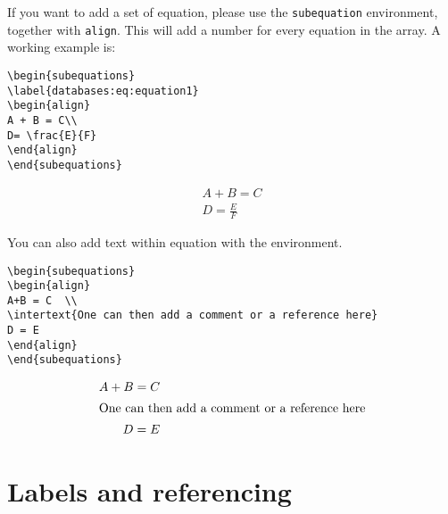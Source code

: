 If you want to add a set of equation, please use the {\tt subequation} environment, together with {\tt align}.
This will add a number for every equation in the array. A working example is:
\begin{verbatim}
\begin{subequations}
\label{databases:eq:equation1}
\begin{align}
A + B = C\\
D= \frac{E}{F}  
\end{align}
\end{subequations}
\end{verbatim}
\begin{subequations}
\label{databases:eq:equation1}
\begin{align}
A + B = C\\
D= \frac{E}{F}  
\end{align}
\end{subequations}

%
You can also add text within equation with the {\tt \string\intertex} environment.
\begin{verbatim}
\begin{subequations}
\begin{align}
A+B = C  \\
\intertext{One can then add a comment or a reference here}
D = E 
\end{align}
\end{subequations}
\end{verbatim}
\begin{subequations}
\begin{align}
A+B = C  \\
\intertext{One can then add a comment or a reference here}
D = E 
\end{align}
\end{subequations}



\section{Labels and referencing}


